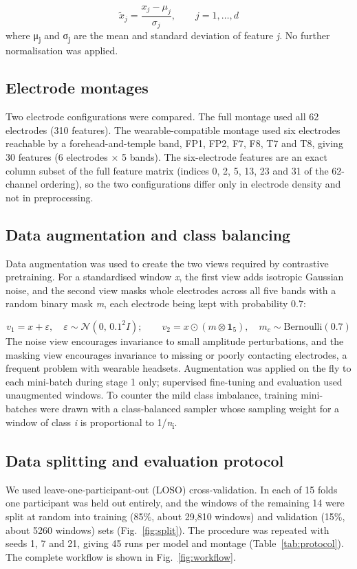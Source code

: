 \begin{equation}
  \tilde{x}_j=\frac{x_j-\mu_j}{\sigma_j},\qquad j=1,\ldots,d
  \label{eq:zscore}
\end{equation}
where μ\textsubscript{j} and σ\textsubscript{j} are the mean and standard deviation of feature \emph{j}. No further normalisation was applied.


\subsection{Electrode montages}
Two electrode configurations were compared. The full montage used all 62 electrodes (310 features). The wearable-compatible montage used six electrodes reachable by a forehead-and-temple band, FP1, FP2, F7, F8, T7 and T8, giving 30 features (6 electrodes × 5 bands). The six-electrode features are an exact column subset of the full feature matrix (indices 0, 2, 5, 13, 23 and 31 of the 62-channel ordering), so the two configurations differ only in electrode density and not in preprocessing.


\subsection{Data augmentation and class balancing}
Data augmentation was used to create the two views required by contrastive pretraining. For a standardised window \emph{x}, the first view adds isotropic Gaussian noise, and the second view masks whole electrodes across all five bands with a random binary mask \emph{m}, each electrode being kept with probability 0.7:

\begin{equation}
  v_1=x+\varepsilon,\quad \varepsilon\sim\mathcal{N}(0,\,0.1^{2}I);\qquad v_2=x\odot(m\otimes\mathbf{1}_5),\quad m_c\sim\mathrm{Bernoulli}(0.7)
  \label{eq:aug}
\end{equation}
The noise view encourages invariance to small amplitude perturbations, and the masking view encourages invariance to missing or poorly contacting electrodes, a frequent problem with wearable headsets. Augmentation was applied on the fly to each mini-batch during stage 1 only; supervised fine-tuning and evaluation used unaugmented windows. To counter the mild class imbalance, training mini-batches were drawn with a class-balanced sampler whose sampling weight for a window of class \emph{i} is proportional to 1/\emph{n}\textsubscript{i}.


\subsection{Data splitting and evaluation protocol}
We used leave-one-participant-out (LOSO) cross-validation. In each of 15 folds one participant was held out entirely, and the windows of the remaining 14 were split at random into training (85\%, about 29,810 windows) and validation (15\%, about 5260 windows) sets (Fig.~\ref{fig:split}). The procedure was repeated with seeds 1, 7 and 21, giving 45 runs per model and montage (Table~\ref{tab:protocol}). The complete workflow is shown in Fig.~\ref{fig:workflow}.

